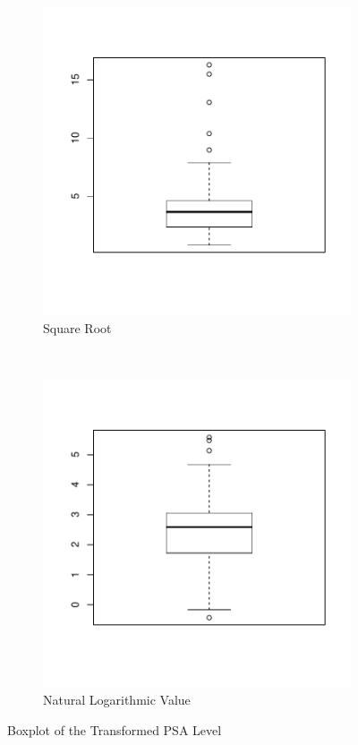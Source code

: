 \documentclass[12pt,letterpaper,titlepage,en-US]{article}
\begin{document}
\begin{figure}[H]
    \centering
    \begin{subfigure}[t]{0.5\textwidth}
        \centering
        \caption{Square Root}\label{obptsqrt}
        \includegraphics[width=.95\textwidth]{fig/boxplotpsasqrt.pdf}
    \end{subfigure}%
    ~
    \begin{subfigure}[t]{0.5\textwidth}
        \centering
        \caption{Natural Logarithmic Value}\label{obptlog}
        \includegraphics[width=.95\textwidth]{fig/boxplotpsalog.pdf}
    \end{subfigure}
    \caption{Boxplot of the Transformed PSA Level}\label{obpt}
\end{figure}
\end{document}
